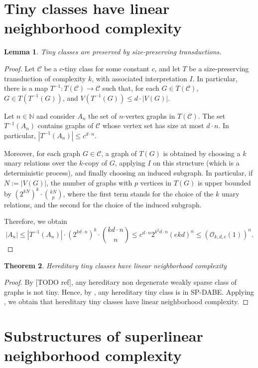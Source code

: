\documentclass[11pt]{article}
\newtheorem{theorem}{Theorem}
\newtheorem{lemma}[theorem]{Lemma}
\theoremstyle{definition}
\newcommand{\CC}{{\mathscr C}}
\newcommand{\N}{\mathbb{N}}
\newcommand{\Oh}{\mathcal{O}}
\renewcommand{\le}{\leqslant}
\begin{document}
\section{Tiny classes have linear neighborhood complexity}
\begin{lemma}\label{lem:tiny-SP}
Tiny classes are preserved by size-preserving transductions.
\end{lemma}
\begin{proof}
Let $\CC$ be a $c$-tiny class for some constant $c$, and let $T$ be a size-preserving transduction of complexity $k$, with associated interpretation $I$.
In particular, there is a map $T^{-1}: T(\CC) \to \CC$ such that, for each $G \in T(\CC)$, $G \in T(T^{-1}(G))$, and $V(T^{-1}(G)) \le d \cdot |V(G)|$.

Let $n \in \N$ and consider $A_n$ the set of $n$-vertex graphs in $T(\CC)$.
The set $T^{-1}(A_n)$ contains graphs of $\CC$ whose vertex set has size at most $d \cdot n$. In particular, $|T^{-1}(A_n)| \le c^{d \cdot n}$.

Moreover, for each graph $G \in \CC$, a graph of $T(G)$ is obtained by choosing a $k$ unary relations over the $k$-copy of $G$, applying $I$ on this structure (which is a deterministic process), and finally choosing an induced subgraph.
In particular, if $N := |V(G)|$, the number of graphs with $p$ vertices in $T(G)$ is upper bounded by $(2^{kN})^k \cdot \binom{kN}{p}$, where the first term stands for the choice of the $k$ unary relations, and the second for the choice of the induced subgraph.

Therefore, we obtain
\[
|A_n| \le |T^{-1}(A_n)| \cdot \left( 2^{k d\cdot n} \right)^k \cdot \binom{k d \cdot n}{n} \le c^{d \cdot n}2^{k^2 d \cdot n} (ekd)^n \le (\Oh_{k, d, c}(1))^n.
\]

\end{proof}
\begin{theorem}\label{thm:tiny}
Hereditary tiny classes have linear neighborhood complexity
\end{theorem}
\begin{proof}
By [TODO ref], any hereditary non degenerate weakly sparse class of graphs is not tiny. Hence, by , any hereditary tiny class is in SP-DABE.
Applying , we obtain that hereditary tiny classes have linear neighborhood complexity.
\end{proof}

\section{Substructures of superlinear neighborhood complexity}
\label{sec:obstructions}
\end{document}
